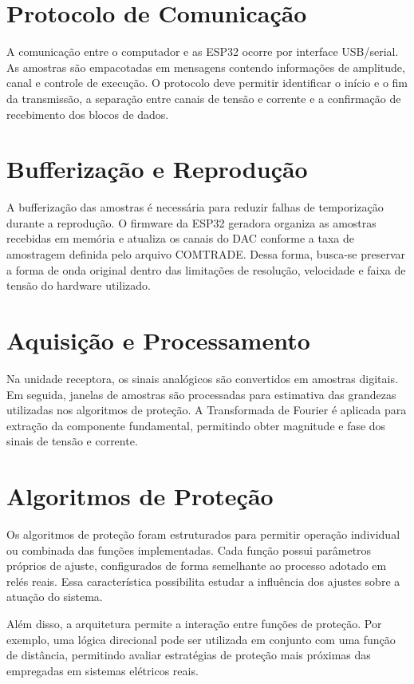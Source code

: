 \section{Protocolo de Comunicação}

A comunicação entre o computador e as ESP32 ocorre por interface USB/serial. As amostras são empacotadas em mensagens contendo informações de amplitude, canal e controle de execução. O protocolo deve permitir identificar o início e o fim da transmissão, a separação entre canais de tensão e corrente e a confirmação de recebimento dos blocos de dados.

\section{Bufferização e Reprodução}

A bufferização das amostras é necessária para reduzir falhas de temporização durante a reprodução. O firmware da ESP32 geradora organiza as amostras recebidas em memória e atualiza os canais do DAC conforme a taxa de amostragem definida pelo arquivo COMTRADE. Dessa forma, busca-se preservar a forma de onda original dentro das limitações de resolução, velocidade e faixa de tensão do hardware utilizado.

\section{Aquisição e Processamento}

Na unidade receptora, os sinais analógicos são convertidos em amostras digitais. Em seguida, janelas de amostras são processadas para estimativa das grandezas utilizadas nos algoritmos de proteção. A Transformada de Fourier é aplicada para extração da componente fundamental, permitindo obter magnitude e fase dos sinais de tensão e corrente.

\section{Algoritmos de Proteção}

Os algoritmos de proteção foram estruturados para permitir operação individual ou combinada das funções implementadas. Cada função possui parâmetros próprios de ajuste, configurados de forma semelhante ao processo adotado em relés reais. Essa característica possibilita estudar a influência dos ajustes sobre a atuação do sistema.

Além disso, a arquitetura permite a interação entre funções de proteção. Por exemplo, uma lógica direcional pode ser utilizada em conjunto com uma função de distância, permitindo avaliar estratégias de proteção mais próximas das empregadas em sistemas elétricos reais.
